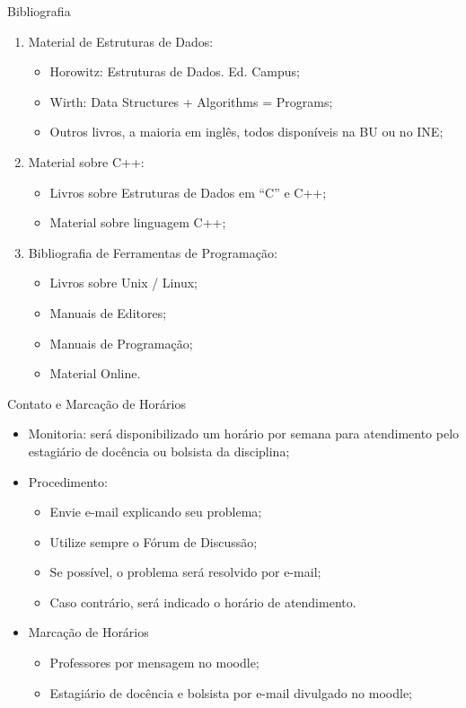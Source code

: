 \documentclass[12pt]{beamer}
\begin{document}
\begin{frame}{Bibliografia}
\begin{enumerate}
\item Material de Estruturas de Dados:
\begin{itemize}
\item Horowitz: Estruturas de Dados. Ed. Campus;
\item Wirth: Data Structures + Algorithms = Programs;
\item Outros livros, a maioria em inglês, todos disponíveis na BU ou no INE;
\end{itemize}
\item Material sobre  C++:
\begin{itemize}
\item Livros sobre Estruturas de Dados em “C” e C++;
\item Material sobre linguagem C++;
\end{itemize}
\item Bibliografia de Ferramentas de Programação:
\begin{itemize}
\item Livros sobre Unix / Linux;
\item Manuais de Editores;
\item Manuais de Programação;
\item Material Online.
\end{itemize}
\end{enumerate}
\end{frame}

\begin{frame}{Contato e Marcação de Horários}
\begin{itemize}
\item Monitoria: será disponibilizado um horário por semana para atendimento pelo estagiário de docência ou bolsista da disciplina;
\item Procedimento:
\begin{itemize}
\item Envie e-mail explicando seu problema;
\item Utilize sempre o Fórum de Discussão;
\item Se possível, o problema será resolvido por e-mail;
\item Caso contrário, será indicado o horário de atendimento.
\end{itemize}
\item Marcação de Horários
\begin{itemize}
\item Professores por mensagem no moodle;
\item Estagiário de docência e bolsista por e-mail divulgado no moodle;
\end{itemize}
\end{itemize}
\end{frame}
\end{document}
